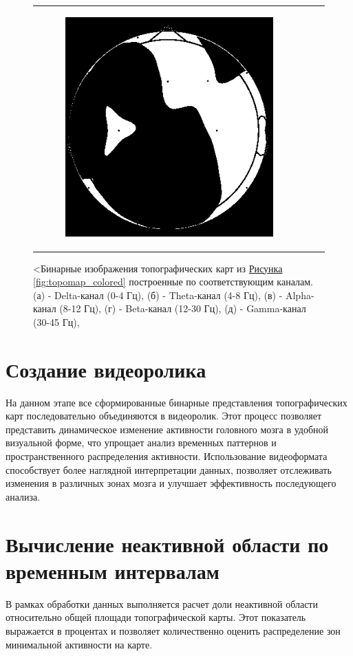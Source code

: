 \begin{figure}[!ht]
\begin{tabular}{ccc}
\begin{subfigure}[c]{0.3\textwidth}
            \includegraphics{images/topomap_gamma_binary.png}
            \caption{}
        \end{subfigure}
    \end{tabular}
    \caption{<Бинарные изображения топографических карт из \hyperref[fig:topomap_colored]{Рисунка \ref*{fig:topomap_colored}} построенные по соответствующим каналам. (а) - Delta-канал (0-4 Гц), (б) - Theta-канал (4-8 Гц), (в) - Alpha-канал (8-12 Гц), (г) - Beta-канал (12-30 Гц), (д) - Gamma-канал (30-45 Гц),}
    \label{fig:topomap_binary}
\end{figure}
    
\section{Создание видеоролика}
На данном этапе все сформированные бинарные представления топографических карт последовательно объединяются в видеоролик. Этот процесс позволяет представить динамическое изменение активности головного мозга в удобной визуальной форме, что упрощает анализ временных паттернов и пространственного распределения активности. Использование видеоформата способствует более наглядной интерпретации данных, позволяет отслеживать изменения в различных зонах мозга и улучшает эффективность последующего анализа.

\section{Вычисление неактивной области по временным интервалам}
В рамках обработки данных выполняется расчет доли неактивной области относительно общей площади топографической карты. Этот показатель выражается в процентах и позволяет количественно оценить распределение зон минимальной активности на карте.

